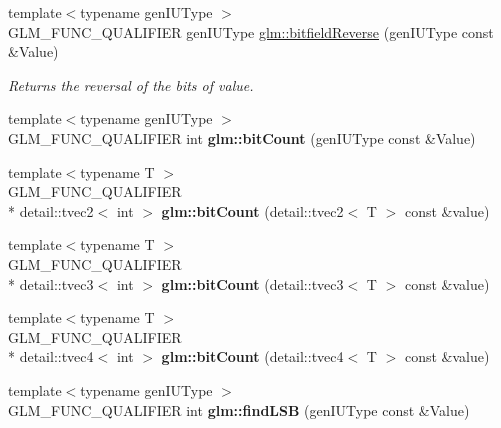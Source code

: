 \begin{DoxyCompactItemize}
\item 
{\footnotesize template$<$typename gen\-I\-U\-Type $>$ }\\G\-L\-M\-\_\-\-F\-U\-N\-C\-\_\-\-Q\-U\-A\-L\-I\-F\-I\-E\-R gen\-I\-U\-Type \hyperlink{group__core__func__integer_ga4cc9293f91c17a2d4c7215573f7a75c2}{glm\-::bitfield\-Reverse} (gen\-I\-U\-Type const \&Value)
\begin{DoxyCompactList}\small\item\em Returns the reversal of the bits of value. \end{DoxyCompactList}\item 
\hypertarget{namespaceglm_a3327aadbf9816a3f8b182cbd9bcb1aac}{{\footnotesize template$<$typename gen\-I\-U\-Type $>$ }\\G\-L\-M\-\_\-\-F\-U\-N\-C\-\_\-\-Q\-U\-A\-L\-I\-F\-I\-E\-R int {\bfseries glm\-::bit\-Count} (gen\-I\-U\-Type const \&Value)}\label{namespaceglm_a3327aadbf9816a3f8b182cbd9bcb1aac}

\item 
\hypertarget{namespaceglm_ac28cce9c64a477f36cda400e50d0f6a2}{{\footnotesize template$<$typename T $>$ }\\G\-L\-M\-\_\-\-F\-U\-N\-C\-\_\-\-Q\-U\-A\-L\-I\-F\-I\-E\-R \\*
detail\-::tvec2$<$ int $>$ {\bfseries glm\-::bit\-Count} (detail\-::tvec2$<$ T $>$ const \&value)}\label{namespaceglm_ac28cce9c64a477f36cda400e50d0f6a2}

\item 
\hypertarget{namespaceglm_af60807263ebcc1859cbb5ffc034182f6}{{\footnotesize template$<$typename T $>$ }\\G\-L\-M\-\_\-\-F\-U\-N\-C\-\_\-\-Q\-U\-A\-L\-I\-F\-I\-E\-R \\*
detail\-::tvec3$<$ int $>$ {\bfseries glm\-::bit\-Count} (detail\-::tvec3$<$ T $>$ const \&value)}\label{namespaceglm_af60807263ebcc1859cbb5ffc034182f6}

\item 
\hypertarget{namespaceglm_a4559432c7a70a196a51a33891d6b6554}{{\footnotesize template$<$typename T $>$ }\\G\-L\-M\-\_\-\-F\-U\-N\-C\-\_\-\-Q\-U\-A\-L\-I\-F\-I\-E\-R \\*
detail\-::tvec4$<$ int $>$ {\bfseries glm\-::bit\-Count} (detail\-::tvec4$<$ T $>$ const \&value)}\label{namespaceglm_a4559432c7a70a196a51a33891d6b6554}

\item 
\hypertarget{namespaceglm_a984d0192bd95085d8efb0a1a00a4e6d9}{{\footnotesize template$<$typename gen\-I\-U\-Type $>$ }\\G\-L\-M\-\_\-\-F\-U\-N\-C\-\_\-\-Q\-U\-A\-L\-I\-F\-I\-E\-R int {\bfseries glm\-::find\-L\-S\-B} (gen\-I\-U\-Type const \&Value)}\label{namespaceglm_a984d0192bd95085d8efb0a1a00a4e6d9}


\end{DoxyCompactItemize}

